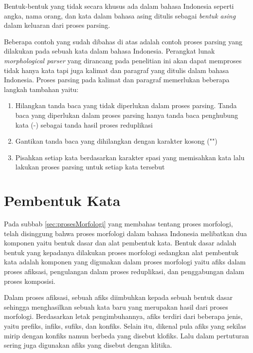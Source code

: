 Bentuk-bentuk yang tidak secara khusus ada dalam bahasa Indonesia seperti angka, nama orang, dan kata dalam bahasa asing ditulis sebagai \textit{bentuk asing} dalam keluaran dari proses parsing.

Beberapa contoh yang sudah dibahas di atas adalah contoh proses parsing yang dilakukan pada sebuah kata dalam bahasa Indonesia. Perangkat lunak \textit{morphological parser} yang dirancang pada penelitian ini akan dapat memproses tidak hanya kata tapi juga kalimat dan paragraf yang ditulis dalam bahasa Indonesia. Proses parsing pada kalimat dan paragraf memerlukan beberapa langkah tambahan yaitu:

\begin{enumerate}
	\item Hilangkan tanda baca yang tidak diperlukan dalam proses parsing. Tanda baca yang diperlukan dalam proses parsing hanya tanda baca penghubung kata (-) sebagai tanda hasil proses reduplikasi
	\item Gantikan tanda baca yang dihilangkan dengan karakter kosong ("")
	\item Pisahkan setiap kata berdasarkan karakter spasi yang memisahkan kata lalu lakukan proses parsing untuk setiap kata tersebut
\end{enumerate}


\section{Pembentuk Kata}
\label{sec:pembentukKata}

Pada subbab \ref{sec:prosesMorfologi} yang membahas tentang proses morfologi, telah disinggung bahwa proses morfologi dalam bahasa Indonesia melibatkan dua komponen yaitu bentuk dasar dan alat pembentuk kata. Bentuk dasar adalah bentuk yang kepadanya dilakukan proses morfologi sedangkan alat pembentuk kata adalah komponen yang digunakan dalam proses morfologi yaitu afiks dalam proses afiksasi, pengulangan dalam proses reduplikasi, dan penggabungan dalam proses komposisi.

Dalam proses afiksasi, sebuah afiks diimbuhkan kepada sebuah bentuk dasar sehingga menghasilkan sebuah kata baru yang merupakan hasil dari proses morfologi. Berdasarkan letak pengimbuhannya, afiks terdiri dari beberapa jenis, yaitu prefiks, infiks, sufiks, dan konfiks. Selain itu, dikenal pula afiks yang sekilas mirip dengan konfiks namun berbeda yang disebut klofiks. Lalu dalam pertuturan sering juga digunakan afiks yang disebut dengan klitika.

